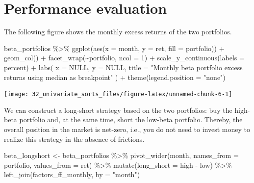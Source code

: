 \documentclass[
]{krantz}
\newenvironment{Shaded}{\begin{snugshade}}{\end{snugshade}}
\newcommand{\AttributeTok}[1]{\textcolor[rgb]{0.61,0.61,0.61}{#1}}
\newcommand{\ConstantTok}[1]{\textcolor[rgb]{0,0,0}{#1}}
\newcommand{\DecValTok}[1]{\textcolor[rgb]{0.06,0.06,0.06}{#1}}
\newcommand{\FunctionTok}[1]{\textcolor[rgb]{0,0,0}{#1}}
\newcommand{\NormalTok}[1]{#1}
\newcommand{\OtherTok}[1]{\textcolor[rgb]{0.37,0.37,0.37}{#1}}
\newcommand{\SpecialCharTok}[1]{\textcolor[rgb]{0,0,0}{#1}}
\newcommand{\StringTok}[1]{\textcolor[rgb]{0.5,0.5,0.5}{#1}}
\begin{document}
\hypertarget{performance-evaluation}{%
\section{Performance evaluation}\label{performance-evaluation}}

The following figure shows the monthly excess returns of the two portfolios.

\begin{Shaded}
\begin{Highlighting}[]
\NormalTok{beta\_portfolios }\SpecialCharTok{\%\textgreater{}\%}
  \FunctionTok{ggplot}\NormalTok{(}\FunctionTok{aes}\NormalTok{(}\AttributeTok{x =}\NormalTok{ month, }\AttributeTok{y =}\NormalTok{ ret, }\AttributeTok{fill =}\NormalTok{ portfolio)) }\SpecialCharTok{+}
  \FunctionTok{geom\_col}\NormalTok{() }\SpecialCharTok{+}
  \FunctionTok{facet\_wrap}\NormalTok{(}\SpecialCharTok{\textasciitilde{}}\NormalTok{portfolio, }\AttributeTok{ncol =} \DecValTok{1}\NormalTok{) }\SpecialCharTok{+}
  \FunctionTok{scale\_y\_continuous}\NormalTok{(}\AttributeTok{labels =}\NormalTok{ percent) }\SpecialCharTok{+}
  \FunctionTok{labs}\NormalTok{(}
    \AttributeTok{x =} \ConstantTok{NULL}\NormalTok{, }\AttributeTok{y =} \ConstantTok{NULL}\NormalTok{,}
    \AttributeTok{title =} \StringTok{"Monthly beta portfolio excess returns using median as breakpoint"}
\NormalTok{  ) }\SpecialCharTok{+}
  \FunctionTok{theme}\NormalTok{(}\AttributeTok{legend.position =} \StringTok{"none"}\NormalTok{)}
\end{Highlighting}
\end{Shaded}

\begin{center}\texttt{[image: 32\_univariate\_sorts\_files/figure-latex/unnamed-chunk-6-1]} \end{center}

We can construct a long-short strategy based on the two portfolios: buy the high-beta portfolio and, at the same time, short the low-beta portfolio. Thereby, the overall position in the market is net-zero, i.e., you do not need to invest money to realize this strategy in the absence of frictions.

\begin{Shaded}
\begin{Highlighting}[]
\NormalTok{beta\_longshort }\OtherTok{\textless{}{-}}\NormalTok{ beta\_portfolios }\SpecialCharTok{\%\textgreater{}\%}
  \FunctionTok{pivot\_wider}\NormalTok{(month, }\AttributeTok{names\_from =}\NormalTok{ portfolio, }\AttributeTok{values\_from =}\NormalTok{ ret) }\SpecialCharTok{\%\textgreater{}\%}
  \FunctionTok{mutate}\NormalTok{(}\AttributeTok{long\_short =}\NormalTok{ high }\SpecialCharTok{{-}}\NormalTok{ low) }\SpecialCharTok{\%\textgreater{}\%}
  \FunctionTok{left\_join}\NormalTok{(factors\_ff\_monthly, }\AttributeTok{by =} \StringTok{"month"}\NormalTok{)}
\end{Highlighting}
\end{Shaded}
\end{document}
